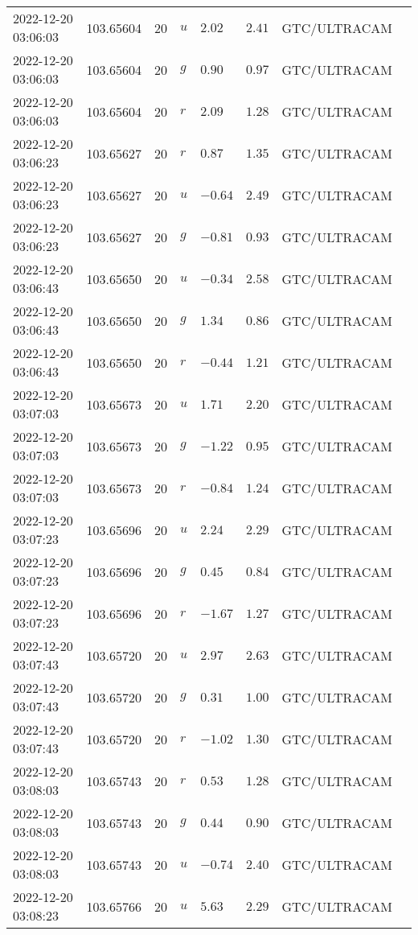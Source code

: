 \documentclass{nature_plusfigure}
\begin{document}
\begin{supplement}
\begin{center}
\begin{longtable}{llllllll}
2022-12-20 03:06:03 & 103.65604 & 20 & $u$ & $2.02$ & $2.41$ & GTC/ULTRACAM &  \\ 
2022-12-20 03:06:03 & 103.65604 & 20 & $g$ & $0.90$ & $0.97$ & GTC/ULTRACAM &  \\ 
2022-12-20 03:06:03 & 103.65604 & 20 & $r$ & $2.09$ & $1.28$ & GTC/ULTRACAM &  \\ 
2022-12-20 03:06:23 & 103.65627 & 20 & $r$ & $0.87$ & $1.35$ & GTC/ULTRACAM &  \\ 
2022-12-20 03:06:23 & 103.65627 & 20 & $u$ & $-0.64$ & $2.49$ & GTC/ULTRACAM &  \\ 
2022-12-20 03:06:23 & 103.65627 & 20 & $g$ & $-0.81$ & $0.93$ & GTC/ULTRACAM &  \\ 
2022-12-20 03:06:43 & 103.65650 & 20 & $u$ & $-0.34$ & $2.58$ & GTC/ULTRACAM &  \\ 
2022-12-20 03:06:43 & 103.65650 & 20 & $g$ & $1.34$ & $0.86$ & GTC/ULTRACAM &  \\ 
2022-12-20 03:06:43 & 103.65650 & 20 & $r$ & $-0.44$ & $1.21$ & GTC/ULTRACAM &  \\ 
2022-12-20 03:07:03 & 103.65673 & 20 & $u$ & $1.71$ & $2.20$ & GTC/ULTRACAM &  \\ 
2022-12-20 03:07:03 & 103.65673 & 20 & $g$ & $-1.22$ & $0.95$ & GTC/ULTRACAM &  \\ 
2022-12-20 03:07:03 & 103.65673 & 20 & $r$ & $-0.84$ & $1.24$ & GTC/ULTRACAM &  \\ 
2022-12-20 03:07:23 & 103.65696 & 20 & $u$ & $2.24$ & $2.29$ & GTC/ULTRACAM &  \\ 
2022-12-20 03:07:23 & 103.65696 & 20 & $g$ & $0.45$ & $0.84$ & GTC/ULTRACAM &  \\ 
2022-12-20 03:07:23 & 103.65696 & 20 & $r$ & $-1.67$ & $1.27$ & GTC/ULTRACAM &  \\ 
2022-12-20 03:07:43 & 103.65720 & 20 & $u$ & $2.97$ & $2.63$ & GTC/ULTRACAM &  \\ 
2022-12-20 03:07:43 & 103.65720 & 20 & $g$ & $0.31$ & $1.00$ & GTC/ULTRACAM &  \\ 
2022-12-20 03:07:43 & 103.65720 & 20 & $r$ & $-1.02$ & $1.30$ & GTC/ULTRACAM &  \\ 
2022-12-20 03:08:03 & 103.65743 & 20 & $r$ & $0.53$ & $1.28$ & GTC/ULTRACAM &  \\ 
2022-12-20 03:08:03 & 103.65743 & 20 & $g$ & $0.44$ & $0.90$ & GTC/ULTRACAM &  \\ 
2022-12-20 03:08:03 & 103.65743 & 20 & $u$ & $-0.74$ & $2.40$ & GTC/ULTRACAM &  \\ 
2022-12-20 03:08:23 & 103.65766 & 20 & $u$ & $5.63$ & $2.29$ & GTC/ULTRACAM &  \\ 

\end{longtable}
\end{center}
\end{supplement}
\end{document}
